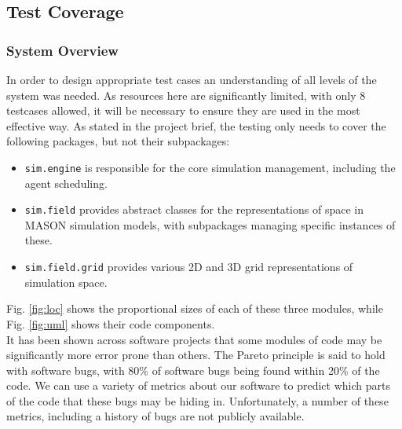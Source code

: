 \documentclass[11pt]{article}
\begin{document}
\subsection{Test Coverage}
\subsubsection{System Overview}
In order to design appropriate test cases an understanding of all levels of the system was needed. As resources here are significantly limited, with only 8 testcases allowed, it will be necessary to ensure they are used in the most effective way.
As stated in the project brief, the testing only needs to cover the following packages, but not their subpackages:

\begin{itemize}
\item \texttt{sim.engine} is responsible for the core simulation management, including the agent scheduling.
\item \texttt{sim.field} provides abstract classes for the representations of space in MASON simulation models, with subpackages managing specific instances of these.
\item \texttt{sim.field.grid} provides various 2D and 3D grid representations of simulation space.
\end{itemize}

Fig. \ref{fig:loc} shows the proportional sizes of each of these three modules, while Fig. \ref{fig:uml} shows their code components. 
\\

It has been shown across software projects that some modules of code may be significantly more error prone than others.
The Pareto principle is said to hold with software bugs, with 80\% of software bugs being found within 20\% of the code\cite[pp. 124]{pressman}.
We can use a variety of metrics about our software to predict which parts of the code that these bugs may be hiding in\cite{predicting_from_history}.
Unfortunately, a number of these metrics, including a history of bugs are not publicly available.
\\
\end{document}
